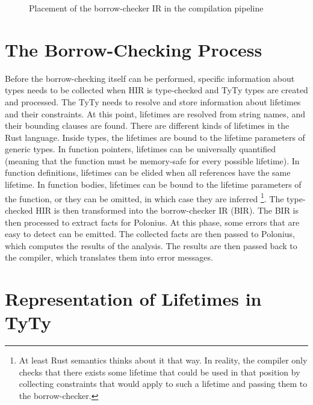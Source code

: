 \documentclass[
  11pt,
  twoside,symmetric]{report}
\begin{document}
\begin{figure}
\centering

\caption{Placement of the borrow-checker IR in the compilation pipeline}
\end{figure}

\hypertarget{the-borrow-checking-process}{%
\section{The Borrow-Checking
Process}\label{the-borrow-checking-process}}

Before the borrow-checking itself can be performed, specific information
about types needs to be collected when HIR is type-checked and TyTy
types are created and processed. The TyTy needs to resolve and store
information about lifetimes and their constraints. At this point,
lifetimes are resolved from string names, and their bounding clauses are
found. There are different kinds of lifetimes in the Rust language.
Inside types, the lifetimes are bound to the lifetime parameters of
generic types. In function pointers, lifetimes can be universally
quantified (meaning that the function must be memory-safe for every
possible lifetime). In function definitions, lifetimes can be elided
when all references have the same lifetime. In function bodies,
lifetimes can be bound to the lifetime parameters of the function, or
they can be omitted, in which case they are inferred \footnote{At least
  Rust semantics thinks about it that way. In reality, the compiler only
  checks that there exists some lifetime that could be used in that
  position by collecting constraints that would apply to such a lifetime
  and passing them to the borrow-checker.}. The type-checked HIR is then
transformed into the borrow-checker IR (BIR). The BIR is then processed
to extract facts for Polonius. At this phase, some errors that are easy
to detect can be emitted. The collected facts are then passed to
Polonius, which computes the results of the analysis. The results are
then passed back to the compiler, which translates them into error
messages.

\hypertarget{representation-of-lifetimes-in-tyty}{%
\section{Representation of Lifetimes in
TyTy}\label{representation-of-lifetimes-in-tyty}}
\end{document}
